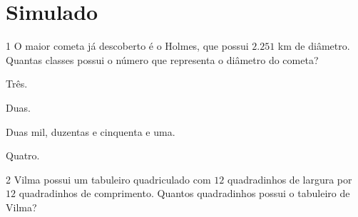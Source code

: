 
%




\setcounter{chapter}{0}
\chapter[Simulado 1]{Simulado}

\num{1}  O maior cometa já descoberto é o Holmes, que possui $2.251$ km de
diâmetro. Quantas classes possui o número que representa o diâmetro do cometa?

\begin{escolha}
\item Três.
\item Duas.
\item Duas mil, duzentas e cinquenta e uma.
\item Quatro.
\end{escolha}



\num{2}  Vilma possui um tabuleiro quadriculado com $12$ quadradinhos de largura
por $12$ quadradinhos de comprimento. Quantos quadradinhos possui o
tabuleiro de Vilma?

